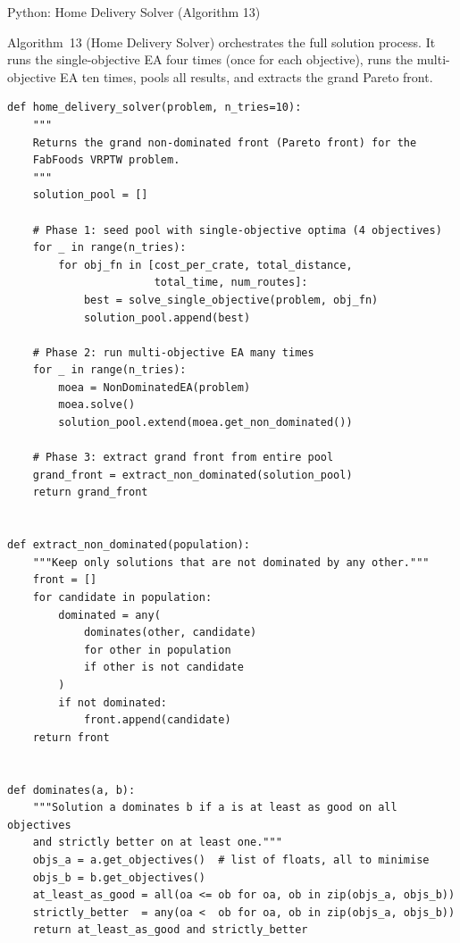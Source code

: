 \documentclass[aspectratio=169,10pt]{beamer}
\begin{document}
\begin{frame}[fragile]{Python: Home Delivery Solver (Algorithm 13)}

  Algorithm~13 (Home Delivery Solver) orchestrates the full solution
  process.  It runs the single-objective EA four times (once for each
  objective), runs the multi-objective EA ten times, pools all results,
  and extracts the grand Pareto front.

\begin{lstlisting}[caption={Home Delivery Solver — Python translation of Algorithm 13 / Listing 5.3}]
def home_delivery_solver(problem, n_tries=10):
    """
    Returns the grand non-dominated front (Pareto front) for the
    FabFoods VRPTW problem.
    """
    solution_pool = []

    # Phase 1: seed pool with single-objective optima (4 objectives)
    for _ in range(n_tries):
        for obj_fn in [cost_per_crate, total_distance,
                       total_time, num_routes]:
            best = solve_single_objective(problem, obj_fn)
            solution_pool.append(best)

    # Phase 2: run multi-objective EA many times
    for _ in range(n_tries):
        moea = NonDominatedEA(problem)
        moea.solve()
        solution_pool.extend(moea.get_non_dominated())

    # Phase 3: extract grand front from entire pool
    grand_front = extract_non_dominated(solution_pool)
    return grand_front


def extract_non_dominated(population):
    """Keep only solutions that are not dominated by any other."""
    front = []
    for candidate in population:
        dominated = any(
            dominates(other, candidate)
            for other in population
            if other is not candidate
        )
        if not dominated:
            front.append(candidate)
    return front


def dominates(a, b):
    """Solution a dominates b if a is at least as good on all objectives
    and strictly better on at least one."""
    objs_a = a.get_objectives()  # list of floats, all to minimise
    objs_b = b.get_objectives()
    at_least_as_good = all(oa <= ob for oa, ob in zip(objs_a, objs_b))
    strictly_better  = any(oa <  ob for oa, ob in zip(objs_a, objs_b))
    return at_least_as_good and strictly_better
\end{lstlisting}

\end{frame}
\end{document}
